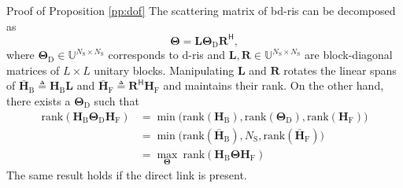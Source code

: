 \documentclass[journal]{IEEEtran}
\begin{document}
\begin{appendix}
	\begin{subsection}{Proof of Proposition \ref{pp:dof}}\label{ap:dof}
		The scattering matrix of \gls{bd}-\gls{ris} can be decomposed as
		\begin{equation}
			\mathbf{\Theta} = \mathbf{L} \mathbf{\Theta}_\mathrm{D} \mathbf{R}^\mathsf{H},
		\end{equation}
		where $\mathbf{\Theta}_\mathrm{D} \in \mathbb{U}^{N_\mathrm{S} \times N_\mathrm{S}}$ corresponds to \gls{d}-\gls{ris} and $\mathbf{L}, \mathbf{R} \in \mathbb{U}^{N_\mathrm{S} \times N_\mathrm{S}}$ are block-diagonal matrices of $L \times L$ unitary blocks.
		Manipulating $\mathbf{L}$ and $\mathbf{R}$ rotates the linear spans of $\bar{\mathbf{H}}_\mathrm{B} \triangleq \mathbf{H}_\mathrm{B} \mathbf{L}$ and $\bar{\mathbf{H}}_\mathrm{F} \triangleq \mathbf{R}^\mathsf{H} \mathbf{H}_\mathrm{F}$ and maintains their rank.
		On the other hand, there exists a $\mathbf{\Theta}_\mathrm{D}$ such that
		\begin{equation*}
			\begin{split}
				\mathrm{rank}(\mathbf{H}_\mathrm{B} \mathbf{\Theta}_\mathrm{D} \mathbf{H}_\mathrm{F})
				 & = \min \bigl( \mathrm{rank}(\mathbf{H}_\mathrm{B}), \mathrm{rank}(\mathbf{\Theta}_\mathrm{D}), \mathrm{rank}(\mathbf{H}_\mathrm{F}) \bigr) \\
				 & = \min \bigl( \mathrm{rank}(\bar{\mathbf{H}}_\mathrm{B}), N_\mathrm{S}, \mathrm{rank}(\bar{\mathbf{H}}_\mathrm{F}) \bigr)                  \\
				 & = \max_\mathbf{\Theta} \ \mathrm{rank}(\mathbf{H}_\mathrm{B} \mathbf{\Theta} \mathbf{H}_\mathrm{F})
			\end{split}
		\end{equation*}
		The same result holds if the direct link is present.
	\end{subsection}


\end{appendix}
\end{document}
